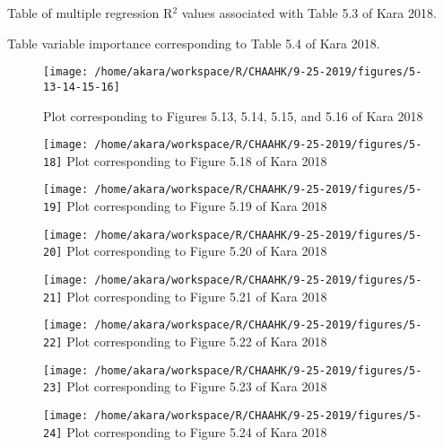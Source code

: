 \documentclass{article}
\begin{document}
\begin{table}[H]
\end{table}
\noindent Table of multiple regression R$ ^{2} $ values associated with Table 5.3 of Kara 2018.
\newline
\begin{table}[H]
\end{table}
\noindent Table variable importance corresponding to Table 5.4 of Kara 2018.
\begin{sidewaysfigure}
	\texttt{[image: /home/akara/workspace/R/CHAAHK/9-25-2019/figures/5-13-14-15-16]}
	\caption{Plot corresponding to Figures 5.13, 5.14, 5.15, and 5.16 of Kara 2018}
	\label{fig:5-13-16}
\end{sidewaysfigure}
\begin{figure}[H]
	\texttt{[image: /home/akara/workspace/R/CHAAHK/9-25-2019/figures/5-18]}
	Plot corresponding to Figure 5.18 of Kara 2018
	\label{fig:5-18}
\end{figure}
\begin{figure}[H]
	\texttt{[image: /home/akara/workspace/R/CHAAHK/9-25-2019/figures/5-19]}
	Plot corresponding to Figure 5.19 of Kara 2018
	\label{fig:5-19}
\end{figure}
\begin{figure}[H]
	\texttt{[image: /home/akara/workspace/R/CHAAHK/9-25-2019/figures/5-20]}
	Plot corresponding to Figure 5.20 of Kara 2018
	\label{fig:5-20}
\end{figure}
\begin{figure}[H]
	\texttt{[image: /home/akara/workspace/R/CHAAHK/9-25-2019/figures/5-21]}
	Plot corresponding to Figure 5.21 of Kara 2018
	\label{fig:5-21}
\end{figure}
\begin{figure}[H]
	\texttt{[image: /home/akara/workspace/R/CHAAHK/9-25-2019/figures/5-22]}
	Plot corresponding to Figure 5.22 of Kara 2018
	\label{fig:5-22}
\end{figure}
\begin{figure}[H]
	\texttt{[image: /home/akara/workspace/R/CHAAHK/9-25-2019/figures/5-23]}
	Plot corresponding to Figure 5.23 of Kara 2018
	\label{fig:5-23}
\end{figure}
\begin{figure}[H]
	\texttt{[image: /home/akara/workspace/R/CHAAHK/9-25-2019/figures/5-24]}
	Plot corresponding to Figure 5.24 of Kara 2018
	\label{fig:5-24}
\end{figure}
\end{document}
